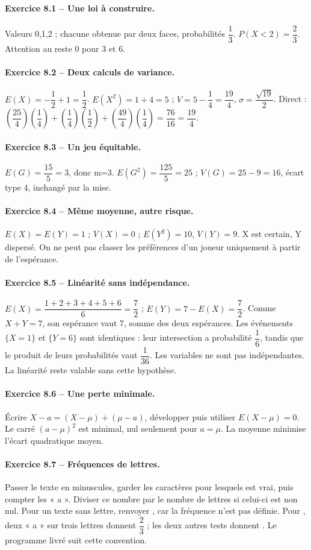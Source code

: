 \paragraph{Exercice 8.1 -- Une loi à construire.} Valeurs 0,1,2 ; chacune obtenue par deux faces, probabilités $\dfrac{1}{3}$. $P(X<2)=\dfrac{2}{3}$. Attention au reste 0 pour 3 et 6.
\paragraph{Exercice 8.2 -- Deux calculs de variance.} $E(X)=-\dfrac{1}{2}+1=\dfrac{1}{2}$. $E(X^2)=1+4=5$ ; $V=5-\dfrac{1}{4}=\dfrac{19}{4}$, $\sigma =\dfrac{\sqrt {19}}{2}$. Direct : $(\dfrac{25}{4})(\dfrac{1}{4})+(\dfrac{1}{4})(\dfrac{1}{2})+(\dfrac{49}{4})(\dfrac{1}{4})=\dfrac{76}{16}=\dfrac{19}{4}$.
\paragraph{Exercice 8.3 -- Un jeu équitable.} $E(G)=\dfrac{15}{5}=3$, donc m=3. $E(G^2)=\dfrac{125}{5}=25$ ; $V(G)=25-9=16$, écart type 4, inchangé par la mise.
\paragraph{Exercice 8.4 -- Même moyenne, autre risque.} $E(X)=E(Y)=1$ ; $V(X)=0$ ; $E(Y^2)=10$, $V(Y)=9$. X est certain, Y dispersé. On ne peut pas classer les préférences d’un joueur uniquement à partir de l’espérance.
\paragraph{Exercice 8.5 -- Linéarité sans indépendance.} $E(X)=\dfrac{1+2+3+4+5+6}{6}=\dfrac72$ ; $E(Y)=7-E(X)=\dfrac72$. Comme $X+Y=7$, son espérance vaut 7, somme des deux espérances. Les événements $\{X=1\}$ et $\{Y=6\}$ sont identiques : leur intersection a probabilité $\dfrac16$, tandis que le produit de leurs probabilités vaut $\dfrac1{36}$. Les variables ne sont pas indépendantes. La linéarité reste valable sans cette hypothèse.
\paragraph{Exercice 8.6 -- Une perte minimale.} Écrire $X-a=(X-\mu)+(\mu-a)$, développer puis utiliser $E(X-\mu)=0$. Le carré $(a-\mu)^2$ est minimal, nul seulement pour $a=\mu$. La moyenne minimise l’écart quadratique moyen.
\paragraph{Exercice 8.7 -- Fréquences de lettres.} Passer le texte en minuscules, garder les caractères pour lesquels  est vrai, puis compter les « a ». Diviser ce nombre par le nombre de lettres si celui-ci est non nul. Pour un texte sans lettre, renvoyer , car la fréquence n’est pas définie. Pour , deux « a » sur trois lettres donnent $\dfrac23$ ; les deux autres tests donnent . Le programme livré  suit cette convention.
